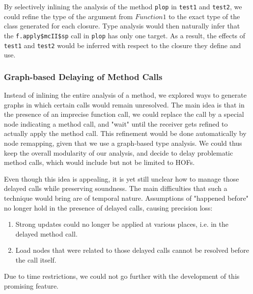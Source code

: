 By selectively inlining the analysis of the method \verb/plop/ in \verb/test1/ and
\verb/test2/, we could refine the type of the argument from $Function1$ to the
exact type of the class generated for each closure. Type analysis would then
naturally infer that the \verb/f.apply$mcII$sp/ call in \verb/plop/ has only
one target.  As a result, the effects of \verb/test1/ and \verb/test2/ would be
inferred with respect to the closure they define and use.

\subsubsection{Graph-based Delaying of Method Calls}
Instead of inlining the entire analysis of a method, we explored ways to
generate graphs in which certain calls would remain unresolved. The main idea
is that in the presence of an imprecise function call, we could replace the
call by a special node indicating a method call, and "wait" until the receiver
gets refined to actually apply the method call. This refinement would be done
automatically by node remapping, given that we use a graph-based type analysis.
We could thus keep the overall modularity of our analysis, and decide to delay
problematic method calls, which would include but not be limited to HOFs.

Even though this idea is appealing, it is yet still unclear how to manage those
delayed calls while preserving soundness. The main difficulties that such a
technique would bring are of temporal nature. Assumptions of "happened before"
no longer hold in the presence of delayed calls, causing precision loss:
\begin{enumerate}
    \item Strong updates could no longer be applied at various places, i.e. in
    the delayed method call.
    \item Load nodes that were related to those delayed calls cannot be resolved
    before the call itself.
\end{enumerate}
Due to time restrictions, we could not go further with the development of this
promising feature.

